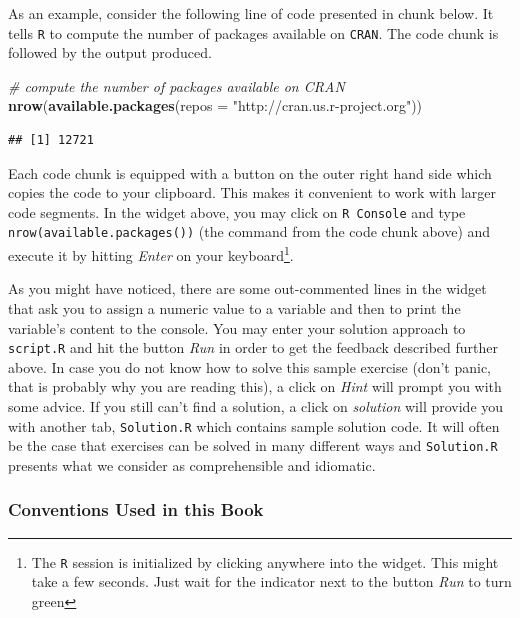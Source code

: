 \documentclass[]{book}
\newenvironment{Shaded}{\begin{snugshade}}{\end{snugshade}}
\newcommand{\KeywordTok}[1]{\textcolor[rgb]{0.13,0.29,0.53}{\textbf{#1}}}
\newcommand{\DataTypeTok}[1]{\textcolor[rgb]{0.13,0.29,0.53}{#1}}
\newcommand{\StringTok}[1]{\textcolor[rgb]{0.31,0.60,0.02}{#1}}
\newcommand{\CommentTok}[1]{\textcolor[rgb]{0.56,0.35,0.01}{\textit{#1}}}
\newcommand{\NormalTok}[1]{#1}
\let\rmarkdownfootnote\footnote%
\def\footnote{\protect\rmarkdownfootnote}
\theoremstyle{definition}
\theoremstyle{definition}
\theoremstyle{definition}
\theoremstyle{remark}
\begin{document}
As an example, consider the following line of code presented in chunk
below. It tells \texttt{R} to compute the number of packages available
on \texttt{CRAN}. The code chunk is followed by the output produced.

\begin{Shaded}
\begin{Highlighting}[]
\CommentTok{# compute the number of packages available on CRAN}
\KeywordTok{nrow}\NormalTok{(}\KeywordTok{available.packages}\NormalTok{(}\DataTypeTok{repos =} \StringTok{"http://cran.us.r-project.org"}\NormalTok{))}
\end{Highlighting}
\end{Shaded}

\begin{verbatim}
## [1] 12721
\end{verbatim}

Each code chunk is equipped with a button on the outer right hand side
which copies the code to your clipboard. This makes it convenient to
work with larger code segments. In the widget above, you may click on
\texttt{R Console} and type \texttt{nrow(available.packages())} (the
command from the code chunk above) and execute it by hitting
\emph{Enter} on your keyboard\footnote{The \texttt{R} session is
  initialized by clicking anywhere into the widget. This might take a
  few seconds. Just wait for the indicator next to the button \emph{Run}
  to turn green}.

As you might have noticed, there are some out-commented lines in the
widget that ask you to assign a numeric value to a variable and then to
print the variable's content to the console. You may enter your solution
approach to \texttt{script.R} and hit the button \emph{Run} in order to
get the feedback described further above. In case you do not know how to
solve this sample exercise (don't panic, that is probably why you are
reading this), a click on \emph{Hint} will prompt you with some advice.
If you still can't find a solution, a click on \emph{solution} will
provide you with another tab, \texttt{Solution.R} which contains sample
solution code. It will often be the case that exercises can be solved in
many different ways and \texttt{Solution.R} presents what we consider as
comprehensible and idiomatic.

\subsubsection*{Conventions Used in this
Book}\label{conventions-used-in-this-book}
\end{document}

